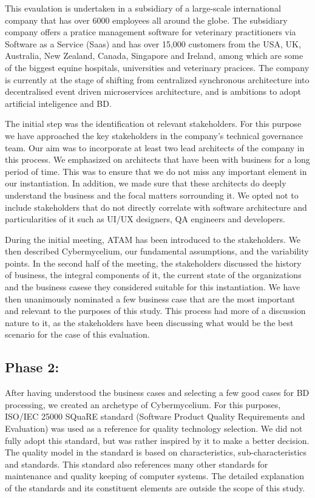 \documentclass[review]{elsarticle}
\begin{document}
This evaulation is undertaken in a subsidiary of a large-scale international company that has over 6000 employees all around the globe. The subsidiary company offers a pratice management software for veterinary practitioners via Software as a Service (Saas) and has over 15,000 customers from the USA, UK, Australia, New Zealand, Canada, Singapore and Ireland, among which are some of the biggest equine hospitals, universities and veterinary pracices. The company is currently at the stage of shifting from centralized synchronous architecture into decentralised event driven microservices architecture, and is ambitions to adopt artificial inteligence and BD.

The initial step was the identification ot relevant stakeholders. For this purpose we have approached the key stakeholders in the company's technical governance team. Our aim was to incorporate at least two lead architects of the company in this process. We emphasized on architects that have been with business for a long period of time. This was to ensure that we do not miss any important element in our instantiation. In addition, we made sure that these architects do deeply understand the business and the focal matters sorrounding it. We opted not to include stakeholders that do not directly correlate with software architecture and particularities of it such as UI/UX designers, QA engineers and developers.

During the initial meeting, ATAM has been introduced to the stakeholders. We then described Cybermycelium, our fundamental assumptions, and the variability points. In the second half of the meeting, the stakeholders discussed the history of business, the integral components of it, the current state of the organizations and the business casese they considered suitable for this instantiation. We have then unanimously nominated a few business case that are the most important and relevant to the purposes of this study. This process had more of a discussion nature to it, as the stakeholders have been discussing what would be the best scenario for the case of this evaluation.

\subsection{Phase 2:}

After having understood the business cases and selecting a few good cases for BD processing, we created an archetype of Cybermycelium. For this purposes, ISO/IEC 25000 SQuaRE standard
(Software Product Quality Requirements and Evaluation) \cite{ISO25000} was used as a reference for quality technology selection. We did not fully adopt this standard, but was rather inspired by it to make a better decision. The quality model in the standard is based on characteristics, sub-characteristics and standards. This standard also references many other standards for maintenance and quality keeping of computer systems. The detailed explanation of the standards and its constituent elements are outside the scope of this study.
\end{document}
